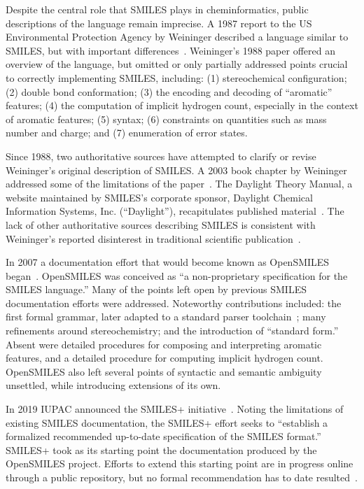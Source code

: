 \documentclass{article}
\begin{document}
Despite the central role that SMILES plays in cheminformatics, public descriptions of the language remain imprecise. A 1987 report to the US Environmental Protection Agency by Weininger described a language similar to SMILES, but with important differences~\cite{anderson:1987}. Weininger's 1988 paper offered an overview of the language, but omitted or only partially addressed points crucial to correctly implementing SMILES, including: (1) stereochemical configuration; (2) double bond conformation; (3) the encoding and decoding of \enquote{aromatic} features; (4) the computation of implicit hydrogen count, especially in the context of aromatic features; (5) syntax; (6) constraints on quantities such as mass number and charge; and (7) enumeration of error states.

Since 1988, two authoritative sources have attempted to clarify or revise Weininger's original description of SMILES. A 2003 book chapter by Weininger addressed some of the limitations of the paper~\cite{weininger:2003}. The Daylight Theory Manual, a website maintained by SMILES's corporate sponsor, Daylight Chemical Information Systems, Inc. (\enquote{Daylight}), recapitulates published material~\cite{daylightTheory}. The lack of other authoritative sources describing SMILES is consistent with Weininger's reported disinterest in traditional scientific publication~\cite{gasteiger:2018}.

In 2007 a documentation effort that would become known as OpenSMILES began~\cite{openSMILES}. OpenSMILES was conceived as \enquote{a non-proprietary specification for the SMILES language.} Many of the points left open by previous SMILES documentation efforts were addressed. Noteworthy contributions included: the first formal grammar, later adapted to a standard parser toolchain~\cite{denjoed:2010}; many refinements around stereochemistry; and the introduction of \enquote{standard form.} Absent were detailed procedures for composing and interpreting aromatic features, and a detailed procedure for computing implicit hydrogen count. OpenSMILES also left several points of syntactic and semantic ambiguity unsettled, while introducing extensions of its own.

In 2019 IUPAC announced the SMILES+ initiative~\cite{smilesPlusSpecification}. Noting the limitations of existing SMILES documentation, the SMILES+ effort seeks to \enquote{establish a formalized recommended up-to-date specification of the SMILES format.} SMILES+ took as its starting point the documentation produced by the OpenSMILES project. Efforts to extend this starting point are in progress online through a public repository, but no formal recommendation has to date resulted~\cite{smilesPlusGitHub}.
\end{document}
